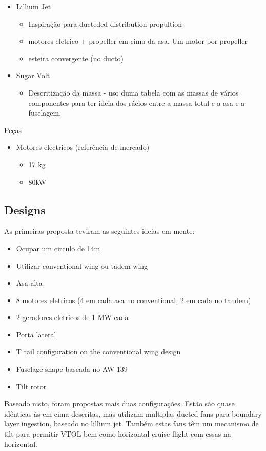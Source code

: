 \begin{itemize}
        \item Lillium Jet
        \begin{itemize}
            \item Inspiração para ducteded distribution propultion
            \item motores eletrico + propeller em cima da asa. Um motor por propeller
            \item esteira convergente (no ducto)
        \end{itemize}
        \item Sugar Volt
        \begin{itemize}
            \item Descritização da massa - uso duma tabela com as massas de vários componentes para ter ideia dos rácios entre a massa total e a asa e a fuselagem.
        \end{itemize}
    \end{itemize}
Peças
\begin{itemize}
    \item Motores electricos (referência de mercado)
    \begin{itemize}
        \item 17 kg
        \item 80kW
    \end{itemize}
\end{itemize}

\subsection{Designs}
As primeiras proposta teviram as seguintes ideias em mente:
\begin{itemize}
    \item Ocupar um circulo de 14m
    \item Utilizar conventional wing ou tadem wing
    \item Asa alta
    \item 8 motores eletricos (4 em cada asa no conventional, 2 em cada no tandem)
    \item 2 geradores eletricos de 1 MW cada
    \item Porta lateral
    \item T tail configuration on the conventional wing design
    \item Fuselage shape baseada no AW 139
    \item Tilt rotor
\end{itemize}

Baseado nisto, foram propostas mais duas configurações. Estão são quase idênticas às em cima descritas, mas utilizam multiplas ducted fans para boundary layer ingestion, baseado no lillium jet. Também estas fans têm um mecanismo de tilt para permitir VTOL bem como horizontal cruise flight com essas na horizontal.
